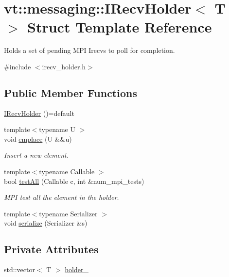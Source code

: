 \hypertarget{structvt_1_1messaging_1_1_i_recv_holder}{}\section{vt\+:\+:messaging\+:\+:I\+Recv\+Holder$<$ T $>$ Struct Template Reference}
\label{structvt_1_1messaging_1_1_i_recv_holder}


Holds a set of pending M\+PI Irecvs to poll for completion.  




{\ttfamily \#include $<$irecv\+\_\+holder.\+h$>$}

\subsection*{Public Member Functions}
\begin{DoxyCompactItemize}
\item 
\hyperlink{structvt_1_1messaging_1_1_i_recv_holder_a709a349d723247b10bf57ca2831bfe19}{I\+Recv\+Holder} ()=default
\item 
{\footnotesize template$<$typename U $>$ }\\void \hyperlink{structvt_1_1messaging_1_1_i_recv_holder_ab81d251a84cb2c8366eb5f5052ce002c}{emplace} (U \&\&u)
\begin{DoxyCompactList}\small\item\em Insert a new element. \end{DoxyCompactList}\item 
{\footnotesize template$<$typename Callable $>$ }\\bool \hyperlink{structvt_1_1messaging_1_1_i_recv_holder_ac1314360b79a5deb3a79b970158e83aa}{test\+All} (Callable c, int \&num\+\_\+mpi\+\_\+tests)
\begin{DoxyCompactList}\small\item\em M\+PI test all the element in the holder. \end{DoxyCompactList}\item 
{\footnotesize template$<$typename Serializer $>$ }\\void \hyperlink{structvt_1_1messaging_1_1_i_recv_holder_a10cebd825dd5ff043368d0dfd3bc9064}{serialize} (Serializer \&s)
\end{DoxyCompactItemize}
\subsection*{Private Attributes}
\begin{DoxyCompactItemize}
\item 
std\+::vector$<$ T $>$ \hyperlink{structvt_1_1messaging_1_1_i_recv_holder_ad906203e102f9180b56d66393bd47c55}{holder\+\_\+}
\end{DoxyCompactItemize}


